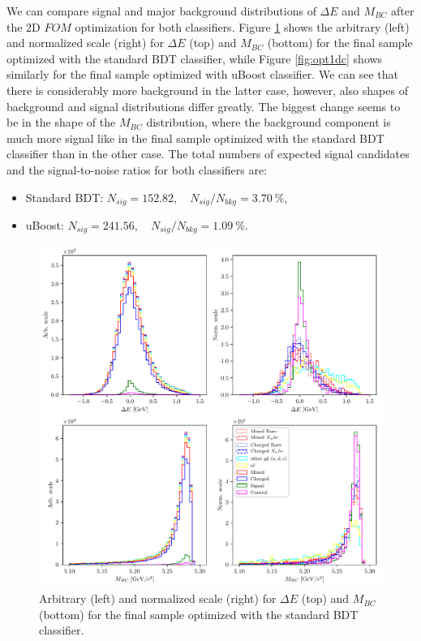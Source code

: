\documentclass[  headings=standardclasses,
  headings=big,oneside,a4paper,openany,12pt]{scrbook}
\begin{document}
We can compare signal and major background distributions of $\Delta E$ and $M_{BC}$ after the 2D $FOM$ optimization for both classifiers. Figure \ref{fig:opt01c} shows the arbitrary (left) and normalized scale (right) for $\Delta E$ (top) and $M_{BC}$ (bottom) for the final sample optimized with the standard BDT classifier, while Figure \ref{fig:opt1dc} shows similarly for the final sample optimized with uBoost classifier. We can see that there is considerably more background in the latter case, however, also shapes of background and signal distributions differ greatly. The biggest change seems to be in the shape of the $M_{BC}$ distribution, where the background component is much more signal like in the final sample optimized with the standard BDT classifier than in the other case. The total numbers of expected signal candidates and the signal-to-noise ratios for both classifiers are:
\begin{itemize}
\item Standard BDT: $N_{sig} = 152.82,\quad N_{sig}/N_{bkg} = 3.70~\%$,
\item uBoost: $N_{sig} = 241.56,\quad N_{sig}/N_{bkg} = 1.09~\%$.
\end{itemize}

\begin{figure}[H]
\centering
\captionsetup{width=0.8\linewidth}
\includegraphics[width=\linewidth]{fig/opt_01c}
\caption{Arbitrary (left) and normalized scale (right) for $\Delta E$ (top) and $M_{BC}$ (bottom) for the final sample optimized with the standard BDT classifier.}
\label{fig:opt01c}
\end{figure} 
\end{document}
